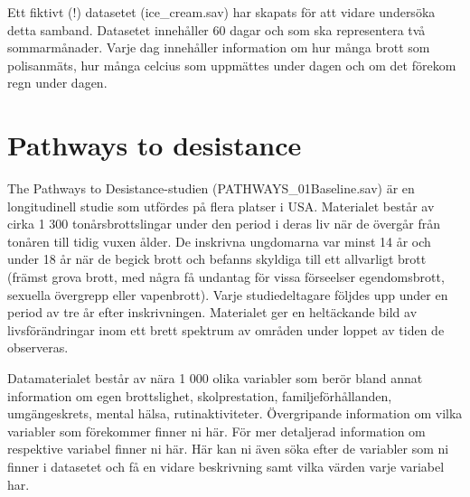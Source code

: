\documentclass[
]{book}
\begin{document}
Ett fiktivt (!) datasetet (ice\_cream.sav) har skapats för att vidare undersöka detta samband. Datasetet innehåller 60 dagar och som ska representera två sommarmånader. Varje dag innehåller information om hur många brott som polisanmäts, hur många celcius som uppmättes under dagen och om det förekom regn under dagen.

\hypertarget{pathways-to-desistance}{%
\section{Pathways to desistance}\label{pathways-to-desistance}}

The Pathways to Desistance-studien (PATHWAYS\_01Baseline.sav) är en longitudinell studie som utfördes på flera platser i USA. Materialet består av cirka 1 300 tonårsbrottslingar under den period i deras liv när de övergår från tonåren till tidig vuxen ålder. De inskrivna ungdomarna var minst 14 år och under 18 år när de begick brott och befanns skyldiga till ett allvarligt brott (främst grova brott, med några få undantag för vissa förseelser egendomsbrott, sexuella övergrepp eller vapenbrott). Varje studiedeltagare följdes upp under en period av tre år efter inskrivningen. Materialet ger en heltäckande bild av livsförändringar inom ett brett spektrum av områden under loppet av tiden de observeras.

Datamaterialet består av nära 1 000 olika variabler som berör bland annat information om egen brottslighet, skolprestation, familjeförhållanden, umgängeskrets, mental hälsa, rutinaktiviteter. Övergripande information om vilka variabler som förekommer finner ni här. För mer detaljerad information om respektive variabel finner ni här. Här kan ni även söka efter de variabler som ni finner i datasetet och få en vidare beskrivning samt vilka värden varje variabel har.

  
\end{document}
